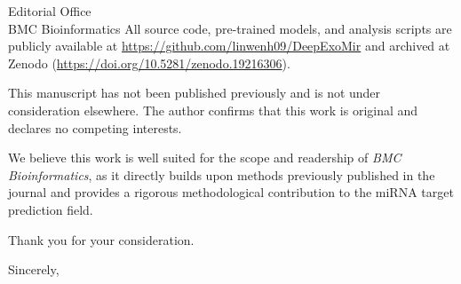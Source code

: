 \documentclass[11pt]{letter}
\begin{document}
\begin{letter}{Editorial Office\\BMC Bioinformatics}
All source code, pre-trained models, and analysis scripts are publicly available at \url{https://github.com/linwenh09/DeepExoMir} and archived at Zenodo (\url{https://doi.org/10.5281/zenodo.19216306}).

This manuscript has not been published previously and is not under consideration elsewhere. The author confirms that this work is original and declares no competing interests.

We believe this work is well suited for the scope and readership of \textit{BMC Bioinformatics}, as it directly builds upon methods previously published in the journal and provides a rigorous methodological contribution to the miRNA target prediction field.

Thank you for your consideration.

\closing{Sincerely,}

\end{letter}
\end{document}
